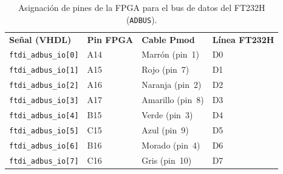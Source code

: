 \documentclass[../main.tex]{subfiles}
\begin{document}
\begin{table}[H]
\centering
\caption{Asignación de pines de la FPGA para el bus de datos del FT232H (\texttt{ADBUS}).}
\label{tab:pines_ft232h_adbus}
\begin{tabular}{>{\raggedright\arraybackslash}p{3.4cm}>{\raggedright\arraybackslash}p{2cm}>{\raggedright\arraybackslash}p{2.4cm}>{\raggedright\arraybackslash}p{4.5cm}}
\rowcolor[HTML]{156082}
{\color{white}\textbf{Señal (VHDL)}} & {\color{white}\textbf{Pin FPGA}} & {\color{white}\textbf{Cable Pmod}} & {\color{white}\textbf{Línea FT232H}} \\
\rowcolor[HTML]{C0E6F5}
\texttt{ftdi\_adbus\_io[0]} & A14 & Marrón (pin~1) & D0 \\
\texttt{ftdi\_adbus\_io[1]} & A15 & Rojo (pin~7) & D1 \\
\rowcolor[HTML]{C0E6F5}
\texttt{ftdi\_adbus\_io[2]} & A16 & Naranja (pin~2) & D2 \\
\texttt{ftdi\_adbus\_io[3]} & A17 & Amarillo (pin~8) & D3 \\
\rowcolor[HTML]{C0E6F5}
\texttt{ftdi\_adbus\_io[4]} & B15 & Verde (pin~3) & D4 \\
\texttt{ftdi\_adbus\_io[5]} & C15 & Azul (pin~9) & D5 \\
\rowcolor[HTML]{C0E6F5}
\texttt{ftdi\_adbus\_io[6]} & B16 & Morado (pin~4) & D6 \\
\texttt{ftdi\_adbus\_io[7]} & C16 & Gris (pin~10) & D7 \\
\end{tabular}
\end{table}
\end{document}
